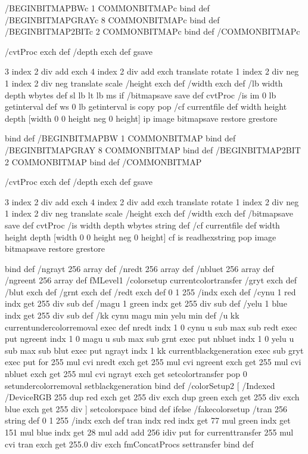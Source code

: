/BEGINBITMAPBWc { 
	1 {} COMMONBITMAPc
	} bind def
/BEGINBITMAPGRAYc { 
	8 {} COMMONBITMAPc
	} bind def
/BEGINBITMAP2BITc { 
	2 {} COMMONBITMAPc
	} bind def
/COMMONBITMAPc { 
		 
	/cvtProc exch def
	/depth exch def
	gsave
	
	3 index 2 div add exch	
	4 index 2 div add exch	
	translate		
	rotate			
	1 index 2 div neg	
	1 index 2 div neg	
	translate		
	scale			
	/height exch def /width exch def
	/lb width depth wbytes def 
	sl lb lt {lb ms} if 
	/bitmapsave save def 
	cvtProc                
	/is im 0 lb getinterval def 
	ws 0 lb getinterval is copy pop 
	/cf currentfile def 
	width height depth [width 0 0 height neg 0 height] 
	{ip} image 
	bitmapsave restore 
	grestore
	} bind def
/BEGINBITMAPBW { 
	1 {} COMMONBITMAP
	} bind def
/BEGINBITMAPGRAY { 
	8 {} COMMONBITMAP
	} bind def
/BEGINBITMAP2BIT { 
	2 {} COMMONBITMAP
	} bind def
/COMMONBITMAP { 
	/cvtProc exch def
	/depth exch def
	gsave
	
	3 index 2 div add exch	
	4 index 2 div add exch	
	translate		
	rotate			
	1 index 2 div neg	
	1 index 2 div neg	
	translate		
	scale			
	/height exch def /width exch def
	/bitmapsave save def 
	cvtProc              
	/is width depth wbytes string def
	/cf currentfile def 
	width height depth [width 0 0 height neg 0 height] 
	{cf is readhexstring pop} image
	bitmapsave restore 
	grestore
	} bind def
/ngrayt 256 array def
/nredt 256 array def
/nbluet 256 array def
/ngreent 256 array def
fMLevel1 {
/colorsetup {
	currentcolortransfer
	/gryt exch def
	/blut exch def
	/grnt exch def
	/redt exch def
	0 1 255 {
		/indx exch def
		/cynu 1 red indx get 255 div sub def
		/magu 1 green indx get 255 div sub def
		/yelu 1 blue indx get 255 div sub def
		/kk cynu magu min yelu min def
		/u kk currentundercolorremoval exec def
		nredt indx 1 0 cynu u sub max sub redt exec put
		ngreent indx 1 0 magu u sub max sub grnt exec put
		nbluet indx 1 0 yelu u sub max sub blut exec put
		ngrayt indx 1 kk currentblackgeneration exec sub gryt exec put
	} for
	{255 mul cvi nredt exch get}
	{255 mul cvi ngreent exch get}
	{255 mul cvi nbluet exch get}
	{255 mul cvi ngrayt exch get}
	setcolortransfer
	{pop 0} setundercolorremoval
	{} setblackgeneration
	} bind def
}
{
/colorSetup2 {
	[ /Indexed /DeviceRGB 255 
		{dup red exch get 255 div 
		 exch dup green exch get 255 div 
		 exch blue exch get 255 div}
	] setcolorspace
} bind def
} ifelse
/fakecolorsetup {
	/tran 256 string def
	0 1 255 {/indx exch def 
		tran indx
		red indx get 77 mul
		green indx get 151 mul
		blue indx get 28 mul
		add add 256 idiv put} for
	currenttransfer
	{255 mul cvi tran exch get 255.0 div}
	exch fmConcatProcs settransfer
} bind def
